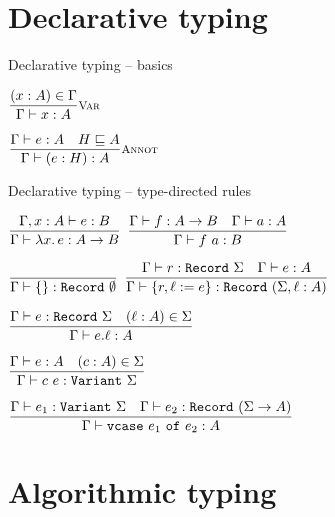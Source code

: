 \documentclass{beamer}
\begin{document}
\section{Declarative typing}

\begin{frame}{Declarative typing -- basics}

\begin{center}
  $\infrule[Var]{\sidecond{(x : A) \in \Gamma}}{\typing{x}{A}}$

  \vspace{2em}

  $\infrule[Annot]{\typing{e}{A} \quad \sidecond{\hintorder{H}{A}}}{\typing{\annot{e}{H}}{A}}$
\end{center}

\end{frame}

\begin{frame}{Declarative typing -- type-directed rules}

\begin{center}
  $\infrule{\fulltyping{\extend{\Gamma}{x}{A}}{e}{B}}{\typing{\fun{x}{e}}{\Fun{A}{B}}}$ \quad
  $\infrule{\typing{f}{\Fun{A}{B}} \quad \typing{a}{A}}{\typing{\app{f}{a}}{B}}$

  \vspace{2em}

  $\infrule{}{\typing{\emptyrecord}{\Record{\emptysig}}}$ \quad
  $\infrule{\typing{r}{\Record{\Sigma}} \quad \typing{e}{A}}{\typing{\extendrecord{r}{\ell}{e}}{\Record{(\extendsig{\Sigma}{\ell}{A})}}}$

  \vspace{2em}

  $\infrule{\typing{e}{\Record{\Sigma}} \quad \sidecond{(\ell : A) \in \Sigma}}{\typing{\proj{e}{\ell}}{A}}$

  \vspace{2em}

  $\infrule{\typing{e}{A} \quad \sidecond{(c : A) \in \Sigma}}{\typing{\cons{c}{e}}{\Variant{\Sigma}}}$

  \vspace{2em}

  $\infrule{\typing{e_1}{\Variant{\Sigma}} \quad \typing{e_2}{\Record{(\funsig{\Sigma}{A})}}}{\typing{\vcase{e_1}{e_2}}{A}}$
\end{center}

\end{frame}

\section{Algorithmic typing}
\end{document}
